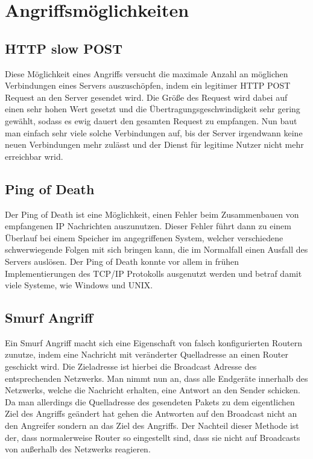 \chapter{Angriffsmöglichkeiten}
\label{chap:kapitel2}
\nocite{WikipediaDoS}

\section{HTTP slow POST}

Diese Möglichkeit eines Angriffs versucht die maximale Anzahl an möglichen Verbindungen eines Servers auszuschöpfen, indem ein legitimer HTTP POST Request an den Server gesendet wird. Die Größe des Request wird dabei auf einen sehr hohen Wert gesetzt und die Übertragungsgeschwindigkeit sehr gering gewählt, sodass es ewig dauert den gesamten Request zu empfangen. Nun baut man einfach sehr viele solche Verbindungen auf, bis der Server irgendwann keine neuen Verbindungen mehr zulässt und der Dienst für legitime Nutzer nicht mehr erreichbar wrid.

\section{Ping of Death}

Der Ping of Death ist eine Möglichkeit, einen Fehler beim Zusammenbauen von empfangenen IP Nachrichten auszunutzen. Dieser Fehler führt dann zu einem Überlauf bei einem Speicher im angegriffenen System, welcher verschiedene schwerwiegende Folgen mit sich bringen kann, die im Normalfall einen Ausfall des Servers auslösen. Der Ping of Death konnte vor allem in frühen Implementierungen des TCP/IP Protokolls ausgenutzt werden und betraf damit viele Systeme, wie Windows und UNIX.

\section{Smurf Angriff}

Ein Smurf Angriff macht sich eine Eigenschaft von falsch konfigurierten Routern zunutze, indem eine Nachricht mit veränderter Quelladresse an einen Router geschickt wird. Die Zieladresse ist hierbei die Broadcast Adresse des entsprechenden Netzwerks. Man nimmt nun an, dass alle Endgeräte innerhalb des Netzwerks, welche die Nachricht erhalten, eine Antwort an den Sender schicken. Da man allerdings die Quelladresse des gesendeten Pakets zu dem eigentlichen Ziel des Angriffs geändert hat gehen die Antworten auf den Broadcast nicht an den Angreifer sondern an das Ziel des Angriffs. Der Nachteil dieser Methode ist der, dass normalerweise Router so eingestellt sind, dass sie nicht auf Broadcasts von außerhalb des Netzwerks reagieren.

